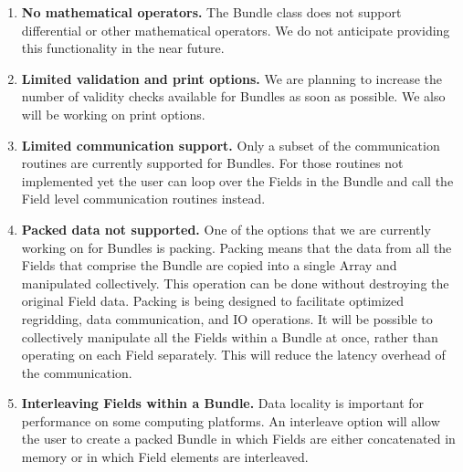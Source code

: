 
\label{sec:bundlerest}

\begin{enumerate}
\item{\bf No mathematical operators.}
The Bundle class does not support differential or other
mathematical operators.  We do not anticipate providing this 
functionality in the near future.

\item{\bf Limited validation and print options.}
We are planning to increase the number of validity checks available
for Bundles as soon as possible.  We also will
be working on print options.

\item{\bf Limited communication support.}
Only a subset of the communication routines are currently supported
for Bundles.  For those routines not implemented yet the user can
loop over the Fields in the Bundle and call the Field level 
communication routines instead.

\item{\bf Packed data not supported.}
One of the options that we are currently working on for Bundles is
packing.  Packing means that the data from all the
Fields that comprise the Bundle are copied into a single Array and
manipulated collectively.  This operation can be done without 
destroying the original Field data.  Packing is being designed to 
facilitate optimized regridding, data communication, and IO operations.  
It will be possible to collectively manipulate all the Fields within 
a Bundle at once, rather than operating on each Field separately.  
This will reduce the latency overhead of the communication.  

\item{\bf Interleaving Fields within a Bundle.}
Data locality is important for performance on some computing
platforms.  An interleave option will allow the user to create
a packed Bundle in which Fields are either concatenated in memory
or in which Field elements are interleaved.

\end{enumerate}




